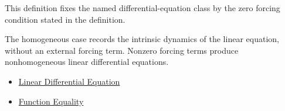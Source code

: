 \begin{remark*}
This definition fixes the named differential-equation class by the zero forcing
condition stated in the definition.
\end{remark*}

\begin{remark*}[Interpretation]
The homogeneous case records the intrinsic dynamics of the linear equation,
without an external forcing term. Nonzero forcing terms produce nonhomogeneous
linear differential equations.
\end{remark*}

\begin{dependencies}
\begin{itemize}
  \item \hyperref[def:ordinary-differential-equations-terminology-linear-differential-equation]{Linear Differential Equation}
  \item \hyperref[def:function-equality]{Function Equality}
\end{itemize}
\end{dependencies}
